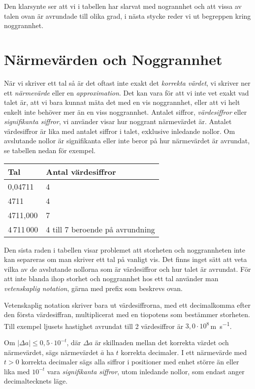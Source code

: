 \bigskip

Den klarsynte ser att vi i tabellen har slarvat med nogrannhet och att
vissa av talen ovan är avrundade till olika grad, i nästa stycke reder
vi ut begreppen kring noggrannhet.

\section{Närmevärden och Noggrannhet}

När vi skriver ett tal så är det oftast inte exakt det \emph{korrekta
värdet}, vi skriver ner ett \emph{närmevärde} eller en
\emph{approximation}.
Det kan vara för att vi inte vet exakt vad talet är, att vi bara kunnat mäta det
med en vis noggrannhet, eller att vi helt enkelt inte behöver mer än en viss
noggrannhet.
Antalet siffror, \emph{värdesiffror} eller \emph{signifikanta siffror}, vi
använder visar hur noggrant närmevärdet är.
Antalet värdesiffror är lika med antalet siffror i talet, exklusive inledande nollor.
Om avslutande nollor är signifikanta eller inte beror på hur närmevärdet är
avrundat, se tabellen nedan för exempel.

\bigskip
\begin{centering}
\begin{tabular}{|l|l|}
\hline
Tal & Antal värdesiffror \\
\hline
0,04711 & 4\\
4711 & 4 \\
4711,000 & 7 \\
4\,711\,000 & 4 till 7 beroende på avrundning \\
\hline
\end{tabular}
\end{centering}
\bigskip

Den sista raden i tabellen visar problemet att storheten och
noggrannheten inte kan separeras om man skriver ett tal på vanligt
vis.
Det finns inget sätt att veta vilka av de avslutande nollorna som är
värdesiffror och hur talet är avrundat.
För att inte blanda ihop storhet och noggrannhet hos ett tal använder man
\emph{vetenskaplig notation}, gärna med prefix som beskrevs ovan.

Vetenskaplig notation skriver bara ut värdesiffrorna, med ett
decimalkomma efter den första värdesiffran, multiplicerat med en
tiopotens som bestämmer storheten.
Till exempel ljusets hastighet avrundat till 2 värdesiffror är
$3,0 \cdot 10^8$\,\unit{\metre\per\second}.

Om $|\Delta a|\leq 0,5\cdot 10^{-t}$, där $\Delta a$ är skillnaden mellan det
korrekta värdet och närmevärdet, sägs närmevärdet $\bar {a}$ ha $t$ korrekta
decimaler.
I ett närmevärde med $t>0$ korrekta decimaler sägs alla siffror i
positioner med enhet större än eller lika med $10^{-t}$ vara
\emph{signifikanta siffror}, utom inledande nollor, som endast anger
decimaltecknets läge.

